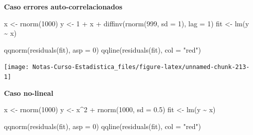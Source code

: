 \documentclass[
  12pt,
]{book}
\newenvironment{Shaded}{\begin{snugshade}}{\end{snugshade}}
\newcommand{\AttributeTok}[1]{\textcolor[rgb]{0.77,0.63,0.00}{#1}}
\newcommand{\DecValTok}[1]{\textcolor[rgb]{0.00,0.00,0.81}{#1}}
\newcommand{\FloatTok}[1]{\textcolor[rgb]{0.00,0.00,0.81}{#1}}
\newcommand{\FunctionTok}[1]{\textcolor[rgb]{0.00,0.00,0.00}{#1}}
\newcommand{\NormalTok}[1]{#1}
\newcommand{\OtherTok}[1]{\textcolor[rgb]{0.56,0.35,0.01}{#1}}
\newcommand{\SpecialCharTok}[1]{\textcolor[rgb]{0.00,0.00,0.00}{#1}}
\newcommand{\StringTok}[1]{\textcolor[rgb]{0.31,0.60,0.02}{#1}}
\theoremstyle{definition}
\theoremstyle{definition}
\theoremstyle{definition}
\theoremstyle{remark}
\begin{document}
\textbf{Caso errores auto-correlacionados}

\begin{Shaded}
\begin{Highlighting}[]
\NormalTok{x }\OtherTok{\textless{}{-}} \FunctionTok{rnorm}\NormalTok{(}\DecValTok{1000}\NormalTok{)}
\NormalTok{y }\OtherTok{\textless{}{-}} \DecValTok{1} \SpecialCharTok{+}\NormalTok{ x }\SpecialCharTok{+} \FunctionTok{diffinv}\NormalTok{(}\FunctionTok{rnorm}\NormalTok{(}\DecValTok{999}\NormalTok{, }\AttributeTok{sd =} \DecValTok{1}\NormalTok{), }\AttributeTok{lag =} \DecValTok{1}\NormalTok{)}
\NormalTok{fit }\OtherTok{\textless{}{-}} \FunctionTok{lm}\NormalTok{(y }\SpecialCharTok{\textasciitilde{}}\NormalTok{ x)}
\end{Highlighting}
\end{Shaded}

\begin{Shaded}
\begin{Highlighting}[]
\FunctionTok{qqnorm}\NormalTok{(}\FunctionTok{residuals}\NormalTok{(fit), }\AttributeTok{asp =} \DecValTok{0}\NormalTok{)}
\FunctionTok{qqline}\NormalTok{(}\FunctionTok{residuals}\NormalTok{(fit), }\AttributeTok{col =} \StringTok{"red"}\NormalTok{)}
\end{Highlighting}
\end{Shaded}

\begin{center}\texttt{[image: Notas-Curso-Estadistica\_files/figure-latex/unnamed-chunk-213-1]} \end{center}

\textbf{Caso no-lineal}

\begin{Shaded}
\begin{Highlighting}[]
\NormalTok{x }\OtherTok{\textless{}{-}} \FunctionTok{rnorm}\NormalTok{(}\DecValTok{1000}\NormalTok{)}
\NormalTok{y }\OtherTok{\textless{}{-}}\NormalTok{ x}\SpecialCharTok{\^{}}\DecValTok{2} \SpecialCharTok{+} \FunctionTok{rnorm}\NormalTok{(}\DecValTok{1000}\NormalTok{, }\AttributeTok{sd =} \FloatTok{0.5}\NormalTok{)}
\NormalTok{fit }\OtherTok{\textless{}{-}} \FunctionTok{lm}\NormalTok{(y }\SpecialCharTok{\textasciitilde{}}\NormalTok{ x)}
\end{Highlighting}
\end{Shaded}

\begin{Shaded}
\begin{Highlighting}[]
\FunctionTok{qqnorm}\NormalTok{(}\FunctionTok{residuals}\NormalTok{(fit), }\AttributeTok{asp =} \DecValTok{0}\NormalTok{)}
\FunctionTok{qqline}\NormalTok{(}\FunctionTok{residuals}\NormalTok{(fit), }\AttributeTok{col =} \StringTok{"red"}\NormalTok{)}
\end{Highlighting}
\end{Shaded}
\end{document}
